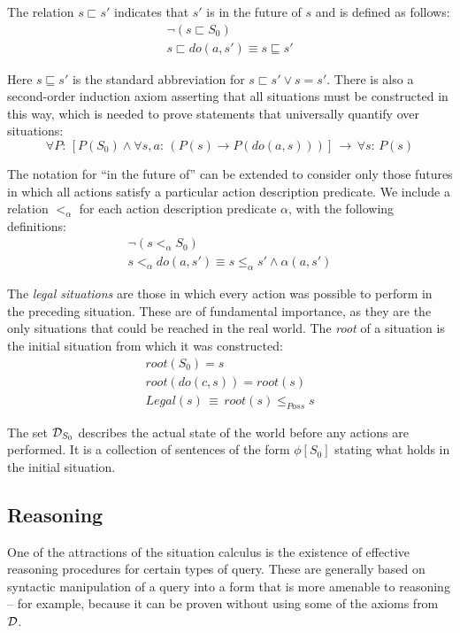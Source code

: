 The relation $s\sqsubset s'$ indicates that $s'$ is in the future
of $s$ and is defined as follows:\begin{gather*}
\neg(s\sqsubset S_{0})\\
s\sqsubset do(a,s')\equiv s\sqsubseteq s'\end{gather*}


Here $s\sqsubseteq s'$ is the standard abbreviation for $s\sqsubset s'\vee s=s'$.
There is also a second-order induction axiom asserting that all situations
must be constructed in this way, which is needed to prove statements
that universally quantify over situations:\[
\forall P:\,\left[P(S_{0})\wedge\forall s,a:\,\left(P(s)\rightarrow P(do(a,s))\right)\right]\,\rightarrow\,\forall s:\, P(s)\]


The notation for {}``in the future of'' can be extended to consider
only those futures in which all actions satisfy a particular action
description predicate. We include a relation $<_{\alpha}$ for each
action description predicate $\alpha$, with the following definitions:\begin{gather*}
\neg\left(s<_{\alpha}S_{0}\right)\\
s<_{\alpha}do(a,s')\equiv s\leq_{\alpha}s'\wedge\alpha(a,s')\end{gather*}


The \emph{legal situations} are those in which every action was possible
to perform in the preceding situation. These are of fundamental importance,
as they are the only situations that could be reached in the real
world. The \emph{root} of a situation is the initial situation from
which it was constructed:\begin{gather*}
root(S_{0})=s\\
root(do(c,s))=root(s)\\
Legal(s)\,\equiv\, root(s)\leq_{Poss}s\end{gather*}


\medskip{}


The set $\mathcal{D}_{S_{0}}$ describes the actual state of the world before
any actions are performed. It is a collection of sentences of the
form $\phi[S_{0}]$ stating what holds in the initial situation.\medskip{}



\subsection{Reasoning}

One of the attractions of the situation calculus is the existence
of effective reasoning procedures for certain types of query. These
are generally based on syntactic manipulation of a query into a form
that is more amenable to reasoning -- for example, because it can
be proven without using some of the axioms from $\mathcal{D}$.

